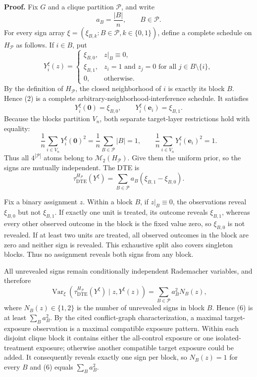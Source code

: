 \textbf{Proof.}
Fix \(G\) and a clique partition \(\mathcal P\), and write
\[
a_B=\frac{|B|}{n},\qquad B\in\mathcal P.
\tag{1}
\]
For every sign array \(\xi=(\xi_{B,k}:B\in\mathcal P,k\in\{0,1\})\), define a complete schedule on \(H_{\mathcal P}\) as follows.  If \(i\in B\), put
\[
Y_i^{\xi}(z)=
\begin{cases}
\xi_{B,0},&z|_B\equiv0,\\
\xi_{B,1},&z_i=1\text{ and }z_j=0\text{ for all }j\in B\setminus\{i\},\\
0,&\text{otherwise}.
\end{cases}
\tag{2}
\]
By the definition of \(H_{\mathcal P}\), the closed neighborhood of \(i\) is exactly its block \(B\).  Hence (2) is a complete arbitrary-neighborhood-interference schedule.  It satisfies
\[
Y_i^{\xi}(\mathbf0)=\xi_{B,0},
\qquad
Y_i^{\xi}(\mathbf e_i)=\xi_{B,1}.
\tag{3}
\]
Because the blocks partition \(V_n\), both separate target-layer restrictions hold with equality:
\[
\frac1n\sum_{i\in V_n}Y_i^{\xi}(\mathbf0)^2
=\frac1n\sum_{B\in\mathcal P}|B|=1,
\qquad
\frac1n\sum_{i\in V_n}Y_i^{\xi}(\mathbf e_i)^2=1.
\tag{4}
\]
Thus all \(4^{|\mathcal P|}\) atoms belong to \(\mathcal M_2(H_{\mathcal P})\).  Give them the uniform prior, so the signs are mutually independent.  The DTE is
\[
\tau_{\mathrm{DTE}}^{H_{\mathcal P}}(Y^{\xi})
=\sum_{B\in\mathcal P}a_B(\xi_{B,1}-\xi_{B,0}).
\tag{5}
\]

Fix a binary assignment \(z\).  Within a block \(B\), if \(z|_B\equiv0\), the observations reveal \(\xi_{B,0}\) but not \(\xi_{B,1}\).  If exactly one unit is treated, its outcome reveals \(\xi_{B,1}\), whereas every other observed outcome in the block is the fixed value zero, so \(\xi_{B,0}\) is not revealed.  If at least two units are treated, all observed outcomes in the block are zero and neither sign is revealed.  This exhaustive split also covers singleton blocks.  Thus no assignment reveals both signs from any block.

All unrevealed signs remain conditionally independent Rademacher variables, and therefore
\[
\operatorname{Var}_{\xi}\!\left(
\tau_{\mathrm{DTE}}^{H_{\mathcal P}}(Y^{\xi})
\mid z,Y^{\xi}(z)
\right)
=\sum_{B\in\mathcal P}a_B^2N_B(z),
\tag{6}
\]
where \(N_B(z)\in\{1,2\}\) is the number of unrevealed signs in block \(B\).  Hence (6) is at least \(\sum_Ba_B^2\).  By the cited conflict-graph characterization, a maximal target-exposure observation is a maximal compatible exposure pattern.  Within each disjoint clique block it contains either the all-control exposure or one isolated-treatment exposure; otherwise another compatible target exposure could be added.  It consequently reveals exactly one sign per block, so \(N_B(z)=1\) for every \(B\) and (6) equals \(\sum_Ba_B^2\).

